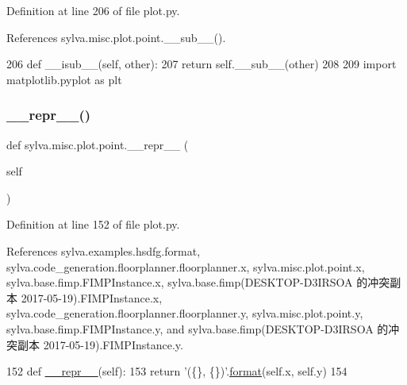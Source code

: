 Definition at line 206 of file plot.\+py.



References sylva.\+misc.\+plot.\+point.\+\_\+\+\_\+sub\+\_\+\+\_\+().


\begin{DoxyCode}
206         \textcolor{keyword}{def }\_\_isub\_\_(self, other):
207             \textcolor{keywordflow}{return} self.\_\_sub\_\_(other)
208 
209     \textcolor{keyword}{import} matplotlib.pyplot \textcolor{keyword}{as} plt
\end{DoxyCode}
\mbox{\label{classsylva_1_1misc_1_1plot_1_1point_ae31f3d284d92f335bf4723af06a45bea}} 
\subsubsection{\texorpdfstring{\+\_\+\+\_\+repr\+\_\+\+\_\+()}{\_\_repr\_\_()}}
{\footnotesize\ttfamily def sylva.\+misc.\+plot.\+point.\+\_\+\+\_\+repr\+\_\+\+\_\+ (\begin{DoxyParamCaption}\item[{}]{self }\end{DoxyParamCaption})}



Definition at line 152 of file plot.\+py.



References sylva.\+examples.\+hsdfg.\+format, sylva.\+code\+\_\+generation.\+floorplanner.\+floorplanner.\+x, sylva.\+misc.\+plot.\+point.\+x, sylva.\+base.\+fimp.\+F\+I\+M\+P\+Instance.\+x, sylva.\+base.\+fimp(\+D\+E\+S\+K\+T\+O\+P-\/\+D3\+I\+R\+S\+O\+A 的冲突副本 2017-\/05-\/19).\+F\+I\+M\+P\+Instance.\+x, sylva.\+code\+\_\+generation.\+floorplanner.\+floorplanner.\+y, sylva.\+misc.\+plot.\+point.\+y, sylva.\+base.\+fimp.\+F\+I\+M\+P\+Instance.\+y, and sylva.\+base.\+fimp(\+D\+E\+S\+K\+T\+O\+P-\/\+D3\+I\+R\+S\+O\+A 的冲突副本 2017-\/05-\/19).\+F\+I\+M\+P\+Instance.\+y.


\begin{DoxyCode}
152         \textcolor{keyword}{def }\hyperlink{namespacesylva_1_1code__generation_1_1floorplanner_a84f24b1e40f5425e9bb40ab45ccbd10f}{\_\_repr\_\_}(self):
153             \textcolor{keywordflow}{return} \textcolor{stringliteral}{'(\{\}, \{\})'}.\hyperlink{namespacesylva_1_1examples_1_1hsdfg_ab3510a0b8457362330aa4d9fd2209590}{format}(self.x, self.y)
154 
\end{DoxyCode}
\mbox{\label{classsylva_1_1misc_1_1plot_1_1point_a0dba47ef31ba24b71bddf5d2c60c104b}} 
